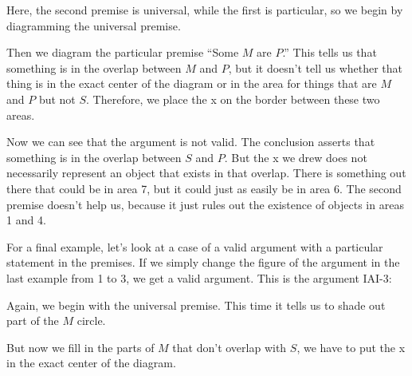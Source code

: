 Here, the second premise is universal, while the first is particular, so we begin by diagramming the universal premise.





Then we diagram the particular premise ``Some $M$ are $P$.'' This tells us that something is in the overlap between $M$ and $P$, but it doesn't tell us whether that thing is in the exact center of the diagram or in the area for things that are $M$ and $P$ but not $S$. Therefore, we place the x on the border between these two areas.





Now we can see that the argument is not valid. The conclusion asserts that something is in the overlap between $S$ and $P$. But the x we drew does not necessarily represent an object that exists in that overlap. There is something out there that could be in area 7, but it could just as easily be in area 6. The second premise doesn't help us, because it just rules out the existence of objects in areas 1 and 4.

For a final example, let's look at a case of a valid argument with a particular statement in the premises. If we simply change the figure of the argument in the last example from 1 to 3, we get a valid argument. This is the argument IAI-3:


\begin{kormanize}
\end{kormanize}

Again, we begin with the universal premise. This time it tells us to shade out part of the $M$ circle.






But now we fill in the parts of $M$ that don't overlap with $S$, we have to put the x in the exact center of the diagram.






